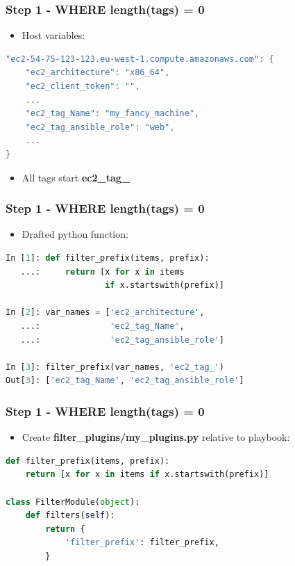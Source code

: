 \documentclass{beamer}
\begin{document}
\begin{frame}[fragile]\frametitle{Step 1 - WHERE length(tags) = 0}

    \begin{itemize}
        \item Host variables:
    \end{itemize}

    \begin{lstlisting}[language=C]
"ec2-54-75-123-123.eu-west-1.compute.amazonaws.com": {
    "ec2_architecture": "x86_64",
    "ec2_client_token": "",
    ...
    "ec2_tag_Name": "my_fancy_machine",
    "ec2_tag_ansible_role": "web",
    ...
}
    \end{lstlisting}

    \begin{itemize}
        \item All tags start \textbf{ec2\_tag\_}
    \end{itemize}

\end{frame}


\begin{frame}[fragile]\frametitle{Step 1 - WHERE length(tags) = 0}

    \begin{itemize}
        \item Drafted python function:
    \end{itemize}

    \begin{lstlisting}[language=Python]
In [1]: def filter_prefix(items, prefix):
   ...:     return [x for x in items
                    if x.startswith(prefix)]

In [2]: var_names = ['ec2_architecture',
   ...:              'ec2_tag_Name',
   ...:              'ec2_tag_ansible_role']

In [3]: filter_prefix(var_names, 'ec2_tag_')
Out[3]: ['ec2_tag_Name', 'ec2_tag_ansible_role']
    \end{lstlisting}

\end{frame}


\begin{frame}[fragile]\frametitle{Step 1 - WHERE length(tags) = 0}

    \begin{itemize}
        \item Create \textbf{filter\_plugins/my\_plugins.py} relative to playbook:
    \end{itemize}

    \begin{lstlisting}[language=Python]
def filter_prefix(items, prefix):
    return [x for x in items if x.startswith(prefix)]

class FilterModule(object):
    def filters(self):
        return {
            'filter_prefix': filter_prefix,
        }
    \end{lstlisting}

\end{frame}
\end{document}
